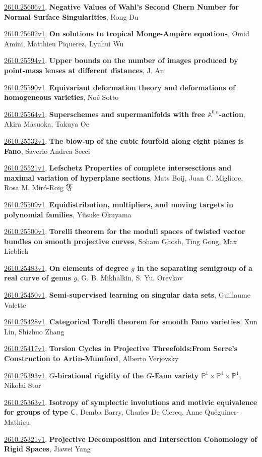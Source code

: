 \documentclass[9pt, a4paper]{article}
\theoremstyle{plain}
\theoremstyle{definition}
\theoremstyle{remark}
\newcommand{\arxiv}[3]{\href{https://arxiv.org/abs/#1}{#1}, \textbf{\textcolor{arxivblue}{#2}}, #3}
\begin{document}
\arxiv{2610.25606v1}{Negative Values of Wahl's Second Chern Number for Normal Surface Singularities}{Rong Du}

\arxiv{2610.25602v1}{On solutions to tropical Monge-Ampère equations}{Omid Amini, Matthieu Piquerez, Lyuhui Wu}

\arxiv{2610.25594v1}{Upper bounds on the number of images produced by point-mass lenses at different distances}{J. An}

\arxiv{2610.25590v1}{Equivariant deformation theory and deformations of homogeneous varieties}{Noé Sotto}

\arxiv{2610.25564v1}{Superschemes and supermanifolds with free $\mathbb{A}^{0|n}$-action}{Akira Masuoka, Takuya Oe}

\arxiv{2610.25532v1}{The blow-up of the cubic fourfold along eight planes is Fano}{Saverio Andrea Secci}

\arxiv{2610.25521v1}{Lefschetz Properties of complete intersesctions and maximal variation of hyperplane sections}{Mats Boij, Juan C. Migliore, Rosa M. Miró-Roig 等}

\arxiv{2610.25509v1}{Equidistribution, multipliers, and moving targets in polynomial families}{Yûsuke Okuyama}

\arxiv{2610.25500v1}{Torelli theorem for the moduli spaces of twisted vector bundles on smooth projective curves}{Soham Ghosh, Ting Gong, Max Lieblich}

\arxiv{2610.25483v1}{On elements of degree $g$ in the separating semigroup of a real curve of genus $g$}{G. B. Mikhalkin, S. Yu. Orevkov}

\arxiv{2610.25450v1}{Semi-supervised learning on singular data sets}{Guillaume Valette}

\arxiv{2610.25428v1}{Categorical Torelli theorem for smooth Fano varieties}{Xun Lin, Shizhuo Zhang}

\arxiv{2610.25417v1}{Torsion Cycles in Projective Threefolds:From Serre's Construction to Artin-Mumford}{Alberto Verjovsky}

\arxiv{2610.25393v1}{$G$-birational rigidity of the $G$-Fano variety $\mathbb{P}^1 \times \mathbb{P}^1 \times \mathbb{P}^1$}{Nikolai Stor}

\arxiv{2610.25363v1}{Isotropy of symplectic involutions and motivic equivalence for groups of type $\sf{C}$}{Demba Barry, Charles De Clercq, Anne Quéguiner-Mathieu}

\arxiv{2610.25321v1}{Projective Decomposition and Intersection Cohomology of Rigid Spaces}{Jiawei Yang}
\end{document}
